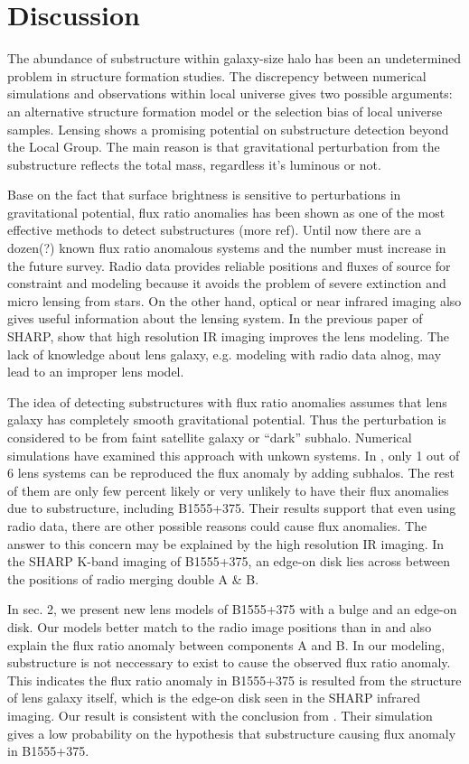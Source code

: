 \documentclass[manuscript]{emulateapj}
\begin{document}
\section{Discussion}
The abundance of substructure within galaxy-size halo has been an undetermined problem in structure formation studies. The discrepency between numerical simulations and observations within local universe gives two possible arguments: an alternative structure formation model or the selection bias of local universe samples. Lensing shows a promising potential on substructure detection beyond the Local Group. The main reason is that gravitational perturbation from the substructure reflects the total mass, regardless it's luminous or not.

Base on the fact that surface brightness is sensitive to perturbations in gravitational potential, flux ratio anomalies has been shown as one of the most effective methods to detect substructures \citep{Dalal2002} (more ref). Until now there are a dozen(?) known flux ratio anomalous systems and the number must increase in the future survey. Radio data provides reliable positions and fluxes of source for constraint and modeling because it avoids the problem of severe extinction and micro lensing from stars. On the other hand, optical or near infrared imaging also gives useful information about the lensing system. In the previous paper of SHARP, \citet{SHARP12} show that high resolution IR imaging improves the lens modeling. The lack of knowledge about lens galaxy, e.g. modeling with radio data alnog, may lead to an improper lens model.

The idea of detecting substructures with flux ratio anomalies assumes that lens galaxy has completely smooth gravitational potential. Thus the perturbation is considered to be from faint satellite galaxy or ``dark'' subhalo. Numerical simulations have examined this approach with unkown systems. In \citet{Xu14}, only 1 out of 6 lens systems can be reproduced the flux anomaly by adding subhalos. The rest of them are only few percent likely or very unlikely to have their flux anomalies due to substructure, including B1555+375. Their results support that even using radio data, there are other possible reasons could cause flux anomalies. The answer to this concern may be explained by the high resolution IR imaging. In the SHARP K-band imaging of B1555+375, an edge-on disk lies across between the positions of radio merging double A \& B.

In sec. 2, we present new lens models of B1555+375 with a bulge and an edge-on disk. Our models better match to the radio image positions than in \citet{Marlow} and also explain the flux ratio anomaly between components A and B. In our modeling, substructure is not neccessary to exist to cause the observed flux ratio anomaly. This indicates the flux ratio anomaly in B1555+375 is resulted from the structure of lens galaxy itself, which is the edge-on disk seen in the SHARP infrared imaging. Our result is consistent with the conclusion from \citet{Xu14}. Their simulation gives a low probability on the hypothesis that substructure causing flux anomaly in B1555+375.
\end{document}
